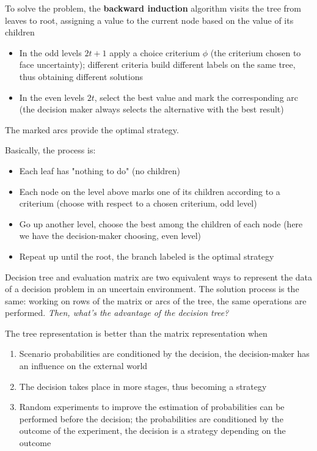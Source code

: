 To solve the problem, the \textbf{backward induction} algorithm visits the tree from leaves to root, assigning a value to the current node based on the value of its children
\begin{itemize}
	\item In the odd levels $2t + 1$ apply a choice criterium $\phi$ (the criterium chosen to face uncertainty); different criteria build different labels on the same tree, thus obtaining different solutions
	
	\item In the even levels $2t$, select the best value and mark the corresponding arc (the decision maker always selects the alternative with the best result)
\end{itemize}
The marked arcs provide the optimal strategy.

Basically, the process is: 
\begin{itemize}
	\item Each leaf has "nothing to do" (no children)
	
	\item Each node on the level above marks one of its children according to a criterium (choose with respect to a chosen criterium, odd level)
	
	\item Go up another level, choose the best among the children of each node (here we have the decision-maker choosing, even level)
	
	\item Repeat up until the root, the branch labeled is the optimal strategy
\end{itemize}

Decision tree and evaluation matrix are two equivalent ways to represent the data of a decision problem in an uncertain environment. The solution process is the same: working on rows of the matrix or arcs of the tree, the same operations are performed. \textit{Then, what's the advantage of the decision tree?}

The tree representation is better than the matrix representation when 
\begin{enumerate}
	\item Scenario probabilities are conditioned by the decision, the decision-maker has an influence on the external world
	
	\item The decision takes place in more stages, thus becoming a strategy 
	
	\item Random experiments to improve the estimation of probabilities can be performed before the decision; the probabilities are conditioned by the outcome of the experiment, the decision is a strategy depending on the outcome
\end{enumerate}

